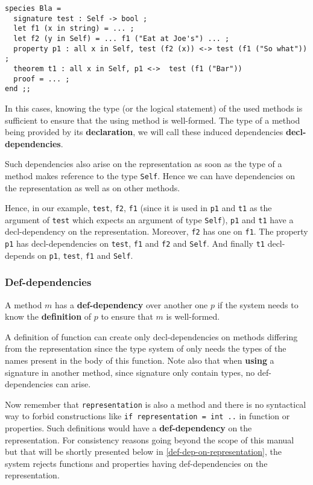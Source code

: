 {\scriptsize
\begin{lstlisting}
species Bla =
  signature test : Self -> bool ;
  let f1 (x in string) = ... ;
  let f2 (y in Self) = ... f1 ("Eat at Joe's") ... ;
  property p1 : all x in Self, test (f2 (x)) <-> test (f1 ("So what")) ;
  theorem t1 : all x in Self, p1 <->  test (f1 ("Bar"))
  proof = ... ;
end ;;
\end{lstlisting}}

In this cases, knowing the type (or the logical statement) of the used
methods is sufficient to ensure that the using method is
well-formed. The type of a method being provided by its
{\bf declaration}, we will call these induced dependencies
{\bf decl-dependencies}.

Such dependencies also arise on the representation as soon as the type
of a method makes reference to the type {\tt Self}. Hence we can have
dependencies on the representation as well as on other methods.

Hence, in our example, {\tt test}, {\tt f2}, {\tt f1} (since it is
used in {\tt p1} and {\tt t1} as the argument of {\tt test} which expects
an argument of type {\tt Self}), {\tt p1} and {\tt t1} have a
decl-dependency on the representation. Moreover, {\tt f2} has one on
{\tt f1}. The property {\tt p1} has decl-dependencies on {\tt test},
{\tt f1} and {\tt f2} and {\tt Self}. And finally {\tt t1}
decl-depends on {\tt p1}, {\tt test}, {\tt f1} and {\tt Self}.



\subsubsection{Def-dependencies}
\label{def-dependency}
A method $m$ has a {\bf def-dependency} over another one $p$ if the system
needs to know the {\bf definition} of $p$ to ensure that $m$ is well-formed.

A definition of function can create only decl-dependencies on
methods differing from the representation since the type system of
{\focal} only needs the types of the names present in the body of this
function. Note also that when {\bf using} a signature in another
method, since signature only contain types, no def-dependencies can
arise.

Now remember that {\tt representation} is also a method and there is no
syntactical way to forbid constructions like {\tt if representation = int ..}
in function or properties. Such definitions would have a {\bf def-dependency}
on the representation.  For
consistency reasons going beyond the scope of this manual but that will be
shortly presented below in \ref{def-dep-on-representation}, the {\focal}
system rejects functions and properties having def-dependencies on the
representation.

